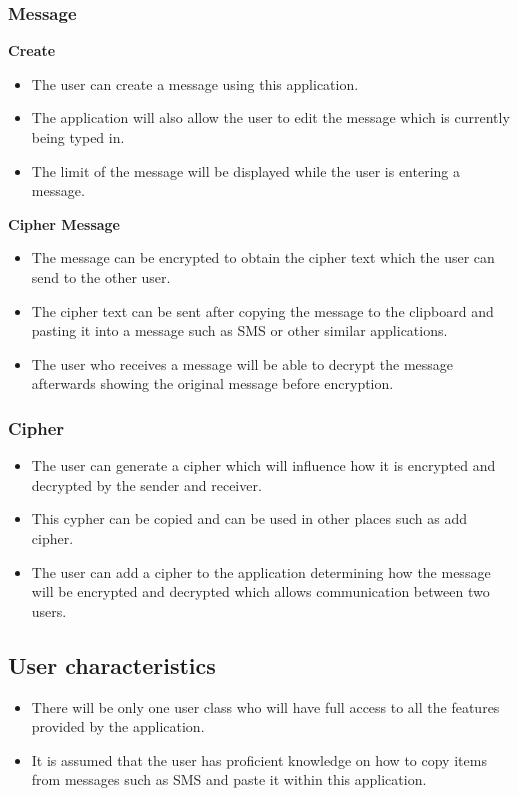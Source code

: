 \subsubsection{Message}
\textbf{Create}
\begin{itemize}
\item The user can create a message using this application.
\item The application will also allow the user to edit the message which is currently being typed in.
\item The limit of the message will be displayed while the user is entering a message.
\end{itemize}
\textbf{Cipher Message}
\begin{itemize}
\item The message can be encrypted to obtain the cipher text which the user can send to the other user. 
\item The cipher text can be sent after copying the message to the clipboard and pasting it into a message such as SMS or other similar applications.
\item The user who receives a message will be able to decrypt the message afterwards showing the original message before encryption.
\end{itemize}


\subsubsection{Cipher}
\begin{itemize}
\item The user can generate a cipher which will influence how it is encrypted and decrypted by the sender and receiver. 
\item This cypher can be copied and can be used in other places such as add cipher.
\item The user can add a cipher to the application determining how the message will be encrypted and decrypted which allows communication between two users.
\end{itemize}

\subsection{User characteristics}
\begin{itemize}
\item There will be only one user class who will have full access to all the features provided by the application.
\item It is assumed that the user has proficient knowledge on how to copy items from messages such as SMS and paste it within this application.
\end{itemize}


